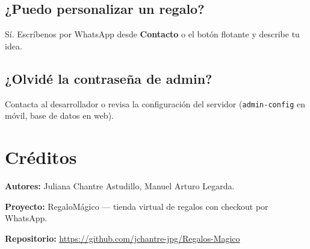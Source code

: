\documentclass[11pt,a4paper,oneside,openany]{scrbook}
\newcommand{\app}{RegaloM\'agico}
\newcommand{\ui}[1]{\textbf{\textcolor{rmRose}{#1}}}
\begin{document}
\section{¿Puedo personalizar un regalo?}

S\'i. Escr\'ibenos por WhatsApp desde \ui{Contacto} o el bot\'on flotante y describe tu idea.

\section{¿Olvid\'e la contrase\~na de admin?}

Contacta al desarrollador o revisa la configuraci\'on del servidor (\texttt{admin-config} en m\'ovil, base de datos en web).

\backmatter
\chapter*{Cr\'editos}

\textbf{Autores:} Juliana Chantre Astudillo, Manuel Arturo Legarda.

\textbf{Proyecto:} \app{} --- tienda virtual de regalos con checkout por WhatsApp.

\textbf{Repositorio:} \url{https://github.com/jchantre-jpg/Regalos-Magico}
\end{document}
